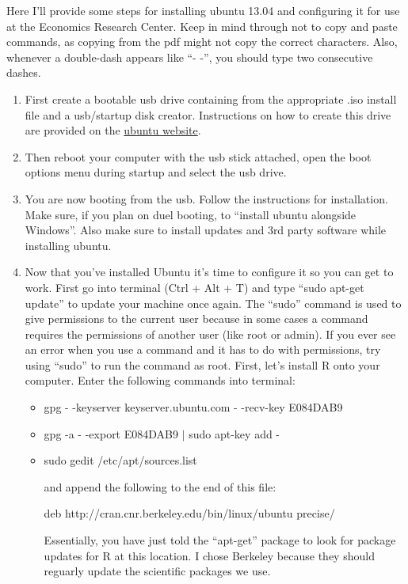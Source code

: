 \documentclass{article}
\begin{document}
Here I'll provide some steps for installing ubuntu 13.04 and configuring it for
use at the Economics Research Center. Keep in mind through not to copy and paste commands, as copying from the pdf might not copy the correct characters. Also, whenever a double-dash appears like ``- -'', you should
type two consecutive dashes. 

\begin{enumerate}
\item First create a bootable usb drive containing from the appropriate .iso install file
and a usb/startup disk creator. Instructions on how to create this drive are provided on
the \href{http://www.ubuntu.com/download/desktop}{ubuntu website}. 	

\item Then reboot your computer with the usb stick attached, open the boot options menu
during startup and select the usb drive. 

\item You are now booting from the usb. Follow the instructions for installation. Make
sure, if you plan on duel booting, to ``install ubuntu alongside Windows''. Also make
sure to install updates and 3rd party software while installing ubuntu. 

\item Now that you've installed Ubuntu it's time to configure it so you can get to work. First
go into terminal (Ctrl + Alt + T) and type ``sudo apt-get update'' to update your machine once again. The ``sudo'' command is used to give permissions to the current user because in some cases a command requires the permissions of another user (like root or admin). If you ever see an error when you use a command and it has to do with permissions, try using ``sudo'' to run the command as root. First, let's 
install R onto your computer. Enter the following commands into terminal:
	
	\begin{itemize}
		 \item gpg - -keyserver keyserver.ubuntu.com - -recv-key E084DAB9
		 \item gpg -a - -export E084DAB9 $\mid$ sudo apt-key add -
		 \item sudo gedit /etc/apt/sources.list

		 and append the following to the end of this file:

		 deb http://cran.cnr.berkeley.edu/bin/linux/ubuntu precise/

		 Essentially, you have just told the ``apt-get'' package to look for 
		 package updates for R at this location. I chose Berkeley because
		 they should reguarly update the scientific packages we use.


\end{itemize}
\end{enumerate}
\end{document}
